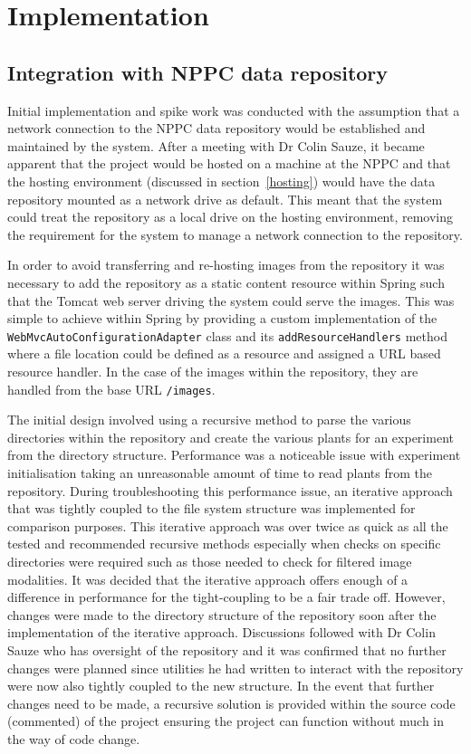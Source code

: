 \chapter{Implementation}



\section{Integration with NPPC data repository}

Initial implementation and spike work was conducted with the assumption that a network connection to the NPPC data repository would be established and maintained by the system. After a meeting with Dr Colin Sauze, it became apparent that the project would be hosted on a machine at the NPPC and that the hosting environment (discussed in section~\ref{hosting}) would have the data repository mounted as a network drive as default. This meant that the system could treat the repository as a local drive on the hosting environment, removing the requirement for the system to manage a network connection to the repository. 

In order to avoid transferring and re-hosting images from the repository it was necessary to add the repository as a static content resource within Spring such that the Tomcat web server driving the system could serve the images. This was simple to achieve within Spring by providing a custom implementation of the \texttt{WebMvcAutoConfigurationAdapter} class and its \texttt{addResourceHandlers} method where a file location could be defined as a resource and assigned a URL based resource handler. In the case of the images within the repository, they are handled from the base URL \texttt{/images}.



The initial design involved using a recursive method to parse the various directories within the repository and create the various plants for an experiment from the directory structure. Performance was a noticeable issue with experiment initialisation taking an unreasonable amount of time to read plants from the repository. During troubleshooting this performance issue, an iterative approach that was tightly coupled to the file system structure was implemented for comparison purposes. This iterative approach was over twice as quick as all the tested and recommended recursive methods especially when checks on specific directories were required such as those needed to check for filtered image modalities.
It was decided that the iterative approach offers enough of a difference in performance for the tight-coupling to be a fair trade off. However, changes were made to the directory structure of the repository soon after the implementation of the iterative approach. Discussions followed with Dr Colin Sauze who has oversight of the repository and it was confirmed that no further changes were planned since utilities he had written to interact with the repository were now also tightly coupled to the new structure. In the event that further changes need to be made, a recursive solution is provided within the source code (commented) of the project ensuring the project can function without much in the way of code change.

